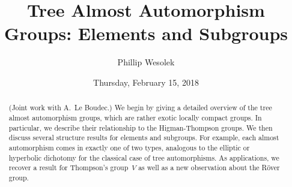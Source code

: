 \documentclass{UAmathtalk}
\author{Phillip Wesolek}
\title{Tree Almost Automorphism Groups: Elements and Subgroups}
\date{Thursday, February 15, 2018}
\begin{document}
\maketitle

\begin{abstract}
(Joint work with A.\ Le Boudec.) We begin by giving a detailed overview of the tree almost automorphism groups, which are rather exotic locally compact groups. In particular, we describe their relationship to the Higman-Thompson groups. We then discuss several structure results for elements and subgroups. For example, each almost automorphism comes in exactly one of two types, analogous to the elliptic or hyperbolic dichotomy for the classical case of tree automorphisms.  As applications, we recover a result for Thompson's group~$V$ as well as a new observation about the Röver group.
\end{abstract}
\end{document}
